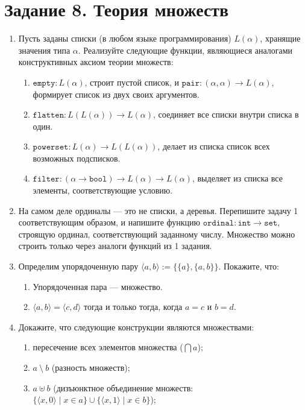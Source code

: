 \documentclass[10pt,a4paper,oneside]{article}
\begin{document}
\section*{Задание 8. Теория множеств}
\begin{enumerate}
\item Пусть заданы списки (в любом языке программирования) $L(\alpha)$, хранящие значения типа $\alpha$.
Реализуйте следующие функции, являющиеся аналогами конструктивных аксиом теории множеств:
\begin{enumerate}
\item $\texttt{empty}: L(\alpha)$, строит пустой список, и $\texttt{pair}: (\alpha, \alpha) \rightarrow L(\alpha)$, формирует список из двух своих аргументов.
\item $\texttt{flatten}: L(L(\alpha)) \rightarrow L(\alpha)$, соединяет все списки внутри списка в один.
\item $\texttt{powerset}: L(\alpha) \rightarrow L(L(\alpha))$, делает из списка список всех возможных подсписков.
\item $\texttt{filter}: (\alpha \rightarrow \texttt{bool}) \rightarrow L(\alpha) \rightarrow L(\alpha)$,
выделяет из списка все элементы, соответствующие условию.
\end{enumerate}
\item На самом деле ординалы --- это не списки, а деревья. Перепишите задачу 1 соответствующим образом,
и напишите функцию $\texttt{ordinal}: \texttt{int} \rightarrow \texttt{set}$, строящую ординал,
соответствующий заданному числу. Множество можно строить только через аналоги функций из 1 задания.
\item Определим упорядоченную пару $\langle a,b\rangle := \{\{a\},\{a,b\}\}$. Покажите, что:
\begin{enumerate}
\item Упорядоченная пара --- множество.
\item $\langle a,b \rangle = \langle c,d\rangle$ тогда и только тогда, когда $a = c$ и $b = d$.
\end{enumerate}
\item Докажите, что следующие конструкции являются множествами: 
\begin{enumerate}
\item пересечение всех элементов множества ($\bigcap a$);
\item $a\ \setminus\ b$ (разность множеств);
\item $a \uplus b$ (дизъюнктное объединение множеств: $\{\langle x,0\rangle\mid x\in a\}\cup\{\langle x,1\rangle\mid x\in b\}$);

\end{enumerate}
\end{enumerate}
\end{document}
